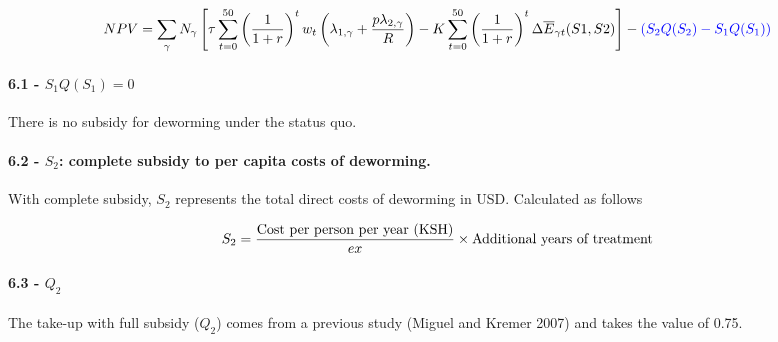 \documentclass[]{article}
\let\oldparagraph\paragraph
\renewcommand{\paragraph}[1]{\oldparagraph{#1}\mbox{}}
\begin{document}
\begin{equation}
NPV =  \sum_{\gamma} N_{\gamma} \left[
\tau \sum_{t=0}^{50}\left(  \frac{1}{1 + r}\right)^{t} w_{t}
\left( \lambda_{1, \gamma}  + \frac{p \lambda_{2, \gamma}}{R} \right) -
K \sum_{t=0}^{50} \left( \frac{1}{1 + r}\right)^{t} \Delta \overline{E}_{\gamma t}(S1,S2)
\right] - \color{blue}{ \left( S_{2}Q(S_{2}) - S_{1}Q(S_{1}) \right) }
\end{equation}

\hypertarget{s_1qs_1-0}{%
\paragraph{\texorpdfstring{6.1 -
\(S_{1}Q(S_{1}) = 0\)}{6.1 - S\_\{1\}Q(S\_\{1\}) = 0}}\label{s_1qs_1-0}}

There is no subsidy for deworming under the status quo.

\hypertarget{s_2-complete-subsidy-to-per-capita-costs-of-deworming.}{%
\paragraph{\texorpdfstring{6.2 - \(S_{2}\): complete subsidy to per
capita costs of
deworming.}{6.2 - S\_\{2\}: complete subsidy to per capita costs of deworming.}}\label{s_2-complete-subsidy-to-per-capita-costs-of-deworming.}}

With complete subsidy, \(S_2\) represents the total direct costs of
deworming in USD. Calculated as follows

\begin{equation}
S_{2} = \frac{\text{Cost per person per year (KSH)} }{ex}\times \text{Additional years of treatment} \\
\end{equation}

\hypertarget{q_2}{%
\paragraph{\texorpdfstring{6.3 - \(Q_{2}\)}{6.3 - Q\_\{2\}}}\label{q_2}}

The take-up with full subsidy (\(Q_2\)) comes from a previous study
(Miguel and Kremer 2007) and takes the value of 0.75.
\end{document}
